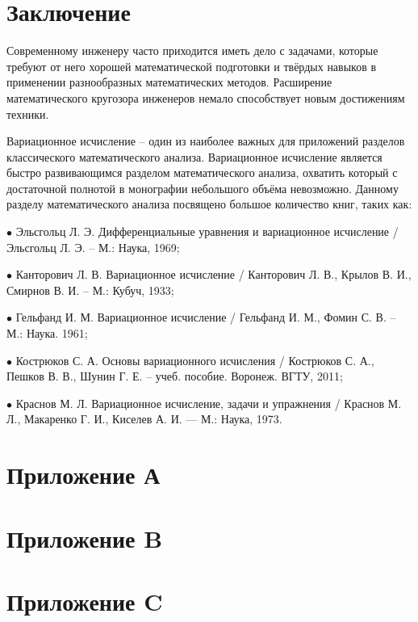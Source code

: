 \documentclass{article}
\begin{document}
\section*{Заключение}

Современному инженеру часто приходится иметь дело с задачами, которые требуют от него хорошей математической подготовки и твёрдых навыков в применении разнообразных математических методов. Расширение математического кругозора инженеров немало способствует новым достижениям техники.

Вариационное исчисление – один из наиболее важных для приложений разделов классического математического анализа. Вариационное исчисление является быстро развивающимся разделом математического анализа, охватить который с достаточной полнотой в монографии небольшого объёма невозможно. Данному разделу математического анализа посвящено большое количество книг, таких как:

$\bullet$ Эльсгольц Л. Э. Дифференциальные уравнения и вариационное исчисление / Эльсгольц Л. Э. – М.: Наука, 1969;

$\bullet$ Канторович Л. В. Вариационное исчисление / Канторович Л. В., Крылов В. И., Смирнов В. И. – М.: Кубуч, 1933;

$\bullet$ Гельфанд И. М. Вариационное исчисление / Гельфанд И. М., Фомин С. В. – М.: Наука. 1961;

$\bullet$ Кострюков С. А. Основы вариационного исчисления / Кострюков С. А., Пешков В. В., Шунин Г. Е. – учеб. пособие. Воронеж. ВГТУ, 2011;

$\bullet$ Краснов М. Л. Вариационное исчисление, задачи и упражнения / Краснов М. Л., Макаренко Г. И., Киселев А. И.  — М.: Наука, 1973.


\newpage
\section*{Приложение А}\label{appendix_a}

\newpage
\section*{Приложение B}\label{appendix_b}

\newpage
\section*{Приложение C}\label{appendix_c}

\newpage

\end{document}
